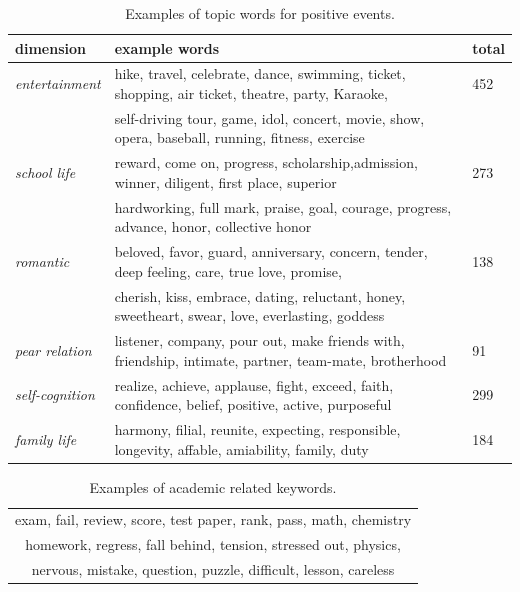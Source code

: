 \begin{table}
\centering
\caption{\small{Examples of topic words for positive events.}}
\label{tab:keyWords}
\small{
\begin{tabular}{lll}
\toprule
dimension & example words & total \\ \midrule
\emph{entertainment}  & hike, travel, celebrate, dance, swimming, ticket, shopping, air ticket, theatre, party, Karaoke,& 452\\
                      & self-driving tour, game, idol, concert, movie, show, opera, baseball, running, fitness, exercise & \\
\emph{school life}    & reward, come on, progress, scholarship,admission, winner, diligent, first place, superior & 273\\
				      & hardworking, full mark,  praise, goal, courage, progress, advance, honor, collective honor& \\
\emph{romantic}       &  beloved, favor, guard, anniversary,  concern, tender, deep feeling, care, true love, promise, & 138\\
				      & cherish, kiss, embrace, dating, reluctant, honey, sweetheart, swear, love, everlasting, goddess &\\
\emph{pear relation}  & listener, company, pour out, make friends with, friendship, intimate, partner, team-mate, brotherhood& 91\\
\emph{self-cognition} & realize, achieve, applause, fight, exceed, faith, confidence, belief, positive, active, purposeful & 299\\
\emph{family life}    & harmony, filial, reunite, expecting, responsible, longevity, affable, amiability, family, duty & 184\\
\bottomrule
\end{tabular}}
\end{table}

\begin{table}[h]
\centering
\caption{\small{Examples of academic related keywords.}}
\label{tab:studyWords}
\small{
\begin{tabular}{c}
\toprule
exam, fail, review, score, test paper, rank, pass, math, chemistry\\
homework, regress, fall behind, tension, stressed out, physics,\\
nervous, mistake, question, puzzle, difficult, lesson, careless\\
\bottomrule
\end{tabular}
}
\end{table}

